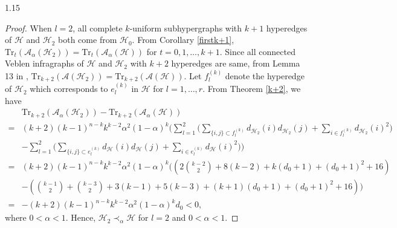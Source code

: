 \documentclass[preprint,12pt]{elsarticle1}
\numberwithin{equation}{section}
\begin{document}
\begin{spacing}{1.15}
\begin{proof}
When $l=2$, all complete $k$-uniform subhypergraphs with $k+1$ hyperedges of $\mathcal{H}$ and $\mathcal{H}_2$ both come from $\mathcal{H}_0$.
From Corollary \ref{firstk+1}, $\mathrm{Tr}_t(\mathcal{A}_{\alpha}(\mathcal{H}_2))=\mathrm{Tr}_t(\mathcal{A}_{\alpha}(\mathcal{H}))$ for $t=0,1,\ldots,k+1$.
Since all connected Veblen infragraphs of $\mathcal{H}$ and $\mathcal{H}_2$ with $k+2$ hyperedges are same, from Lemma 13 in \cite{ref10}, $\mathrm{Tr}_{k+2}(\mathcal{A}(\mathcal{H}_2))=\mathrm{Tr}_{k+2}(\mathcal{A}(\mathcal{H}))$.
Let $f_{l}^{(k)}$ denote the hyperedge of $\mathcal{H}_2$ which corresponds to $e_{l}^{(k)}$ in $\mathcal{H}$ for $l=1,\ldots,r$.
From Theorem \ref{k+2}, we have
\begin{align*}
&\mathrm{Tr}_{k+2}(\mathcal{A}_{\alpha}(\mathcal{H}_2))-\mathrm{Tr}_{k+2}(\mathcal{A}_{\alpha}(\mathcal{H}))\\
=& (k+2)(k-1)^{n-k}k^{k-2} \alpha^{2}(1-\alpha)^{k} \Bigg(\sum\limits_{l=1}^{2}\bigg(\sum\limits_{\{i,j\}\subset f^{(k)}_l}d_{\mathcal{H}_2}(i)d_{\mathcal{H}_2}(j)+\sum\limits_{i\in f^{(k)}_l}d_{\mathcal{H}_2}(i)^{2}\bigg) \\&-\sum\limits_{l=1}^{2}\bigg(\sum\limits_{\{i,j\}\subset e^{(k)}_l}d_{\mathcal{H}}(i)d_{\mathcal{H}}(j)+\sum\limits_{i\in e^{(k)}_l}d_{\mathcal{H}}(i)^{2}\bigg)\Bigg) \\
=& (k+2)(k-1)^{n-k}k^{k-2} \alpha^{2}(1-\alpha)^{k} \Bigg( \left( 2\binom{k-2}{2}+8(k-2)+k(d_0+1)+(d_0+1)^2+16 \right) \\&-\left( \binom{k-1}{2}+\binom{k-3}{2}+3(k-1)+5(k-3)+(k+1)(d_0+1)+(d_0+1)^2+16 \right) \Bigg)\\
=&-(k+2)(k-1)^{n-k}k^{k-2}\alpha^{2}(1-\alpha)^{k}d_0<0,
\end{align*}
where $0<\alpha<1$.
Hence, $\mathcal{H}_2\prec_{\alpha}\mathcal{H}$ for $l=2$ and $0<\alpha<1$.


\end{proof}
\end{spacing}
\end{document}

